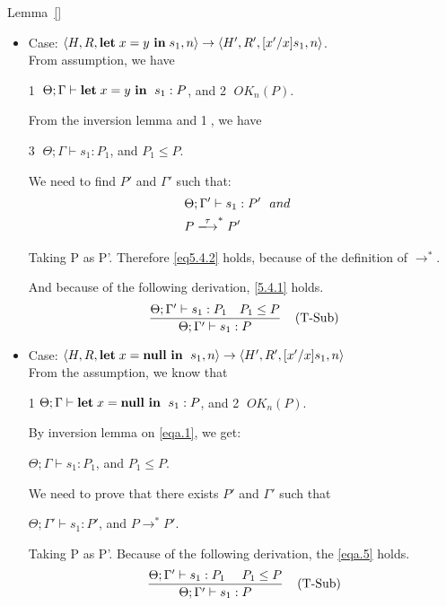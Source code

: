 \begin{pfof}{Lemma~\ref{}}
\begin{itemize}
\item Case: $\langle H, R, \mathbf{let}\; x = y\  \mathbf{in}\; s_{1} , n \rangle \rightarrow  \langle H', R', [x'/x]s_{1}, n  \rangle $. \\

From assumption, we have 
\begin{center}
\textcircled{1} $\Theta; \Gamma \vdash \mathbf{let}\; x = y\  \mathbf{in}\; \  s_{1} : P$, and \textcircled{2} $OK_{n}(P)$.
\end{center}

From the inversion lemma and \textcircled{1}, we have 
\begin{center}
\textcircled{3} $\Theta; \Gamma \vdash s_{1} : P_{1}$, and $P_{1} \le P$.
\end{center}

We need to find $P'$ and $\Gamma'$ such that:
\begin{align}
  &\Theta; \Gamma' \vdash s_{1} : P' \ \ and& \label{eq5.4.1}\\
  &P \xlongrightarrow{\tau}^{*} P'& \label{eq5.4.2}
\end{align}

Taking P as P'. Therefore \eqref{eq5.4.2} holds, because of the definition of $\rightarrow^{*}$.

And because of the following derivation, \eqref{5.4.1} holds.
$$
  \frac{\Theta; \Gamma' \vdash s_{1} : P_{1} \ \ \ P_{1} \le P}
  {\Theta; \Gamma' \vdash s_{1} : P}
  \; \; \; \; \mbox{(T-Sub)}
$$

\item Case: $\langle H, R, \mathbf{let}\; x = \mathbf{null} \  \mathbf{in}\; \  s_{1}, n \rangle \rightarrow \langle H', R', [x'/x]s_{1}, n \rangle $\\

From the assumption, we know that
\begin{center}
\textcircled{1}$\Theta; \Gamma \vdash \mathbf{let}\; x = \mathbf{null} \  \mathbf{in}\; \ s_{1} : P$, and \textcircled{2} $OK_{n}(P)$.
\end{center}

By inversion lemma on \eqref{eqa.1}, we get:
\begin{center}
$\Theta; \Gamma \vdash s_{1} : P_{1}$, and $ P_{1} \le P$.
\end{center}

We need to prove that there exists $P'$ and $\Gamma'$ such that
\begin{center}
$\Theta; \Gamma' \vdash s_{1} : P'$, and $P \rightarrow^{*} P'$.
\end{center}

Taking P as P'. Because of the following derivation, the \eqref{eqa.5} holds.
$$
  \frac{\Theta; \Gamma' \vdash s_{1} : P_{1} \ \ \ \ P_{1} \le P}
  {\Theta; \Gamma' \vdash s_{1} : P}
  \Rtab \mbox{(T-Sub)}
$$


\end{itemize}
\end{pfof}
